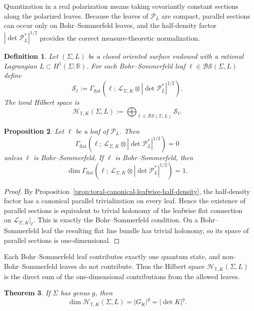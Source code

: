 \documentclass[12pt]{amsart}
\numberwithin{equation}{section}
\newtheorem{theorem}{Theorem}[section]
\newtheorem{prop}[theorem]{Proposition}
\newtheorem{definition}[theorem]{Definition}
\begin{document}
Quantization in a real polarization means taking covariantly constant sections along the polarized leaves. Because the leaves of \(\mathcal P_L\) are compact, parallel sections can occur only on Bohr--Sommerfeld leaves, and the half-density
factor \( |\det\mathcal P_L^*|^{1/2}\) provides the correct measure-theoretic normalization.

\begin{definition}
\label{def:toral-hilbert}
Let $(\Sigma,L)$ be a closed oriented surface endowed with a rational
Lagrangian $L\subset H^1(\Sigma;\mathbb R)$. For each
Bohr--Sommerfeld leaf $\ell\in \mathcal{BS}(\Sigma,L)$ define
\[
\mathscr S_\ell:=
\Gamma_{\mathrm{flat}}
\!\left(
\ell;\,
\mathcal L_{\Sigma,K}\otimes |\det\mathcal P_L^*|^{1/2}
\right).
\]
The toral Hilbert space is
\[
\mathcal H_{\mathbb T,K}(\Sigma,L)
:=
\bigoplus_{\ell\in \mathcal{BS}(\Sigma,L)}\mathscr S_\ell.
\]
\end{definition}

\begin{prop}
\label{prop:toral-BS-one-dimensional}
Let $\ell$ be a leaf of $\mathcal P_L$.
Then
\[
\Gamma_{\mathrm{flat}}
\!\left(
\ell;\,
\mathcal L_{\Sigma,K}\otimes |\det\mathcal P_L^*|^{1/2}
\right)
=
0
\]
unless $\ell$ is Bohr--Sommerfeld. If $\ell$ is Bohr--Sommerfeld, then
\[
\dim
\Gamma_{\mathrm{flat}}
\!\left(
\ell;\,
\mathcal L_{\Sigma,K}\otimes |\det\mathcal P_L^*|^{1/2}
\right)
=1.
\]
\end{prop}

\begin{proof}
By Proposition~\ref{prop:toral-canonical-leafwise-half-density}, the
half-density factor has a canonical parallel trivialization on every leaf.
Hence the existence of parallel sections is equivalent to trivial holonomy of
the leafwise flat connection on $\mathcal L_{\Sigma,K}|_\ell$.
This is exactly the Bohr--Sommerfeld condition.
On a Bohr--Sommerfeld leaf the resulting flat line bundle has trivial holonomy,
so its space of parallel sections is one-dimensional.
\end{proof}

Each Bohr--Sommerfeld leaf contributes exactly one quantum state, and non-Bohr--Sommerfeld leaves do not contribute. Thus the Hilbert space \(\mathcal H_{\mathbb T,K}(\Sigma,L)\) is  the direct sum of the one-dimensional contributions from the allowed leaves.

\begin{theorem}
\label{thm:toral-hilbert-dimension}
If $\Sigma$ has genus $g$, then
\[
\dim \mathcal H_{\mathbb T,K}(\Sigma,L)
=
|G_K|^g
=
|\det K|^g.
\]
\end{theorem}
\end{document}
